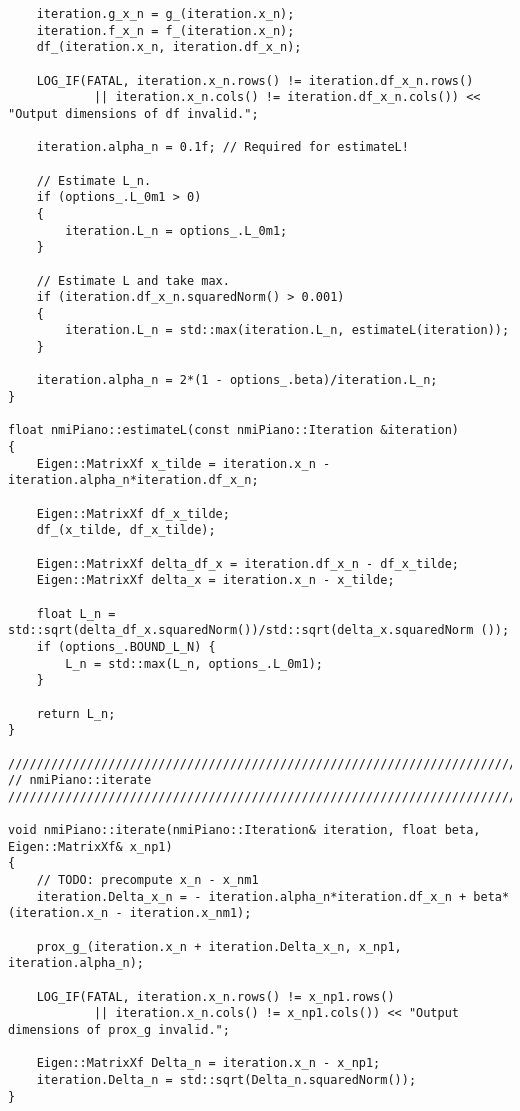 \documentclass[11pt]{article}
\begin{document}
\begin{lstlisting}
    iteration.g_x_n = g_(iteration.x_n);
    iteration.f_x_n = f_(iteration.x_n);
    df_(iteration.x_n, iteration.df_x_n);
    
    LOG_IF(FATAL, iteration.x_n.rows() != iteration.df_x_n.rows() 
            || iteration.x_n.cols() != iteration.df_x_n.cols()) << "Output dimensions of df invalid.";
    
    iteration.alpha_n = 0.1f; // Required for estimateL!
    
    // Estimate L_n.
    if (options_.L_0m1 > 0)
    {
        iteration.L_n = options_.L_0m1;
    }
    
    // Estimate L and take max.
    if (iteration.df_x_n.squaredNorm() > 0.001)
    {
        iteration.L_n = std::max(iteration.L_n, estimateL(iteration));
    }
    
    iteration.alpha_n = 2*(1 - options_.beta)/iteration.L_n;
}

float nmiPiano::estimateL(const nmiPiano::Iteration &iteration)
{
    Eigen::MatrixXf x_tilde = iteration.x_n - iteration.alpha_n*iteration.df_x_n;

    Eigen::MatrixXf df_x_tilde;
    df_(x_tilde, df_x_tilde);

    Eigen::MatrixXf delta_df_x = iteration.df_x_n - df_x_tilde;
    Eigen::MatrixXf delta_x = iteration.x_n - x_tilde;
    
    float L_n = std::sqrt(delta_df_x.squaredNorm())/std::sqrt(delta_x.squaredNorm ());
    if (options_.BOUND_L_N) {
        L_n = std::max(L_n, options_.L_0m1);
    }
    
    return L_n;
}

////////////////////////////////////////////////////////////////////////////////
// nmiPiano::iterate
////////////////////////////////////////////////////////////////////////////////

void nmiPiano::iterate(nmiPiano::Iteration& iteration, float beta, Eigen::MatrixXf& x_np1)
{
    // TODO: precompute x_n - x_nm1
    iteration.Delta_x_n = - iteration.alpha_n*iteration.df_x_n + beta*(iteration.x_n - iteration.x_nm1);
    
    prox_g_(iteration.x_n + iteration.Delta_x_n, x_np1, iteration.alpha_n);
    
    LOG_IF(FATAL, iteration.x_n.rows() != x_np1.rows() 
            || iteration.x_n.cols() != x_np1.cols()) << "Output dimensions of prox_g invalid.";
    
    Eigen::MatrixXf Delta_n = iteration.x_n - x_np1;
    iteration.Delta_n = std::sqrt(Delta_n.squaredNorm());
}


\end{lstlisting}
\end{document}
